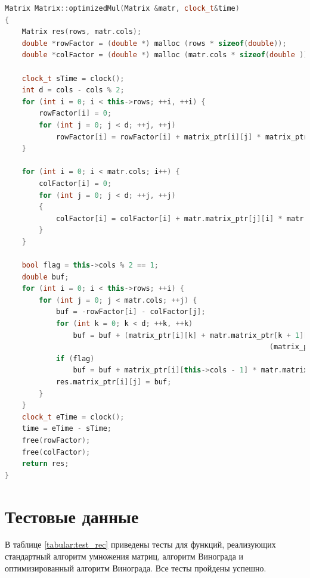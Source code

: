 \documentclass[12pt]{report}
\begin{document}
\begin{lstlisting}[label=some-code,caption=Функция умножения матриц по Винограду с оптимизацией,language=c++]
Matrix Matrix::optimizedMul(Matrix &matr, clock_t&time)
{
    Matrix res(rows, matr.cols);
    double *rowFactor = (double *) malloc (rows * sizeof(double));
    double *colFactor = (double *) malloc (matr.cols * sizeof(double ));

    clock_t sTime = clock();
    int d = cols - cols % 2;
    for (int i = 0; i < this->rows; ++i, ++i) {
        rowFactor[i] = 0;
        for (int j = 0; j < d; ++j, ++j)
            rowFactor[i] = rowFactor[i] + matrix_ptr[i][j] * matrix_ptr[i][j + 1];
    }

    for (int i = 0; i < matr.cols; i++) {
        colFactor[i] = 0;
        for (int j = 0; j < d; ++j, ++j)
        {
            colFactor[i] = colFactor[i] + matr.matrix_ptr[j][i] * matr.matrix_ptr[j + 1][i];
        }
    }

    bool flag = this->cols % 2 == 1;
    double buf;
    for (int i = 0; i < this->rows; ++i) {
        for (int j = 0; j < matr.cols; ++j) {
            buf = -rowFactor[i] - colFactor[j];
            for (int k = 0; k < d; ++k, ++k)
                buf = buf + (matrix_ptr[i][k] + matr.matrix_ptr[k + 1][j]) *
                                                              (matrix_ptr[i][k + 1] + matr.matrix_ptr[k][j]);
            if (flag)
                buf = buf + matrix_ptr[i][this->cols - 1] * matr.matrix_ptr[this->cols - 1][j];
            res.matrix_ptr[i][j] = buf;
        }
    }
    clock_t eTime = clock();
    time = eTime - sTime;
    free(rowFactor);
    free(colFactor);
    return res;
}
\end{lstlisting}

\section{Тестовые данные}

В таблице \ref{tabular:test_rec} приведены тесты для функций, реализующих стандартный алгоритм умножения матриц, алгоритм Винограда и оптимизированный алгоритм Винограда. Все тесты пройдены успешно.
\end{document}

